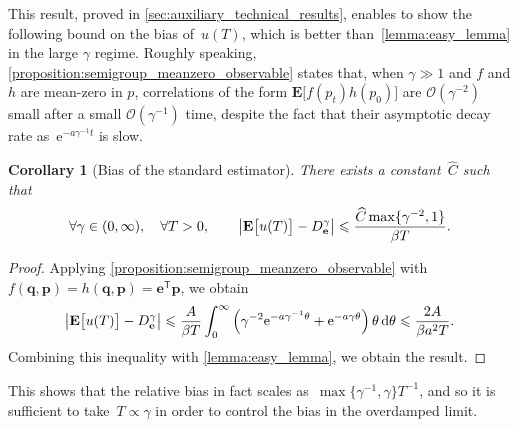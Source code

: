 \documentclass[11pt,a4paper]{article}
\newcommand{\e}{\mathrm{e}}
\newcommand{\expect}[0]{\mathbf{E}}
\newcommand{\vect}[1]{\boldsymbol{\mathbf #1}}
\renewcommand{\d}{\mathrm d}
\renewcommand{\t}{\mathsf T}
\theoremstyle{plain}
\newtheorem{corollary}[theorem]{Corollary}
\numberwithin{equation}{section}
\renewcommand{\leq}{\leqslant}
\begin{document}
This result, proved in \cref{sec:auxiliary_technical_results},
enables to show the following bound on the bias of~$u(T)$,
which is better than~\cref{lemma:easy_lemma} in the large $\gamma$ regime.
Roughly speaking, \cref{proposition:semigroup_meanzero_observable} states that,
when $\gamma \gg 1$ and $f$ and $h$ are mean-zero in $p$,
correlations of the form $\expect \bigl[ f(p_t) h(p_0) \bigr]$ are $\mathcal O(\gamma^{-2})$ small after a small $\mathcal O(\gamma^{-1})$ time,
despite the fact that their asymptotic decay rate as~$\e^{- a \gamma^{-1} t}$ is slow.
\begin{corollary}
    [Bias of the standard estimator]
    \label{corollary:better_bias}
    There exists a constant~$\widehat C$ such that
    \begin{equation}
        \label{eq:bias}
        \forall \gamma \in (0, \infty),
        \quad
        \forall T > 0,
        \qquad
        \abs{\expect \bigl[u(T)\bigr] - D_{\vect e}^{\gamma}}
        \leq
        \frac{\widehat C \max \{\gamma^{-2}, 1\}}{\beta T}.
    \end{equation}
\end{corollary}
\begin{proof}
    Applying \cref{proposition:semigroup_meanzero_observable} with $f(\vect q, \vect p) = h(\vect q, \vect p) = \vect e^\t \vect p$, we obtain
    \begin{equation}
        \label{eq:refined_bound_for_u}
        \abs{\expect \bigl[u(T)\bigr] - D^{\gamma}_{\vect e}}
        \leq \frac{A}{\beta T} \int_{0}^{\infty} \left( \gamma^{-2} \e^{- a \gamma^{-1} \theta} + \e^{-a  \gamma \theta} \right)  \theta \, \d \theta
        \leq \frac{2A}{\beta a^2 T}.
    \end{equation}
    Combining this inequality with \cref{lemma:easy_lemma},
    we obtain the result.
\end{proof}
This shows that the relative bias in fact scales as~$\max\{\gamma^{-1}, \gamma\} T^{-1}$,
and so it is sufficient to take~$T \propto \gamma$ in order to control the bias in the overdamped limit.
\end{document}
